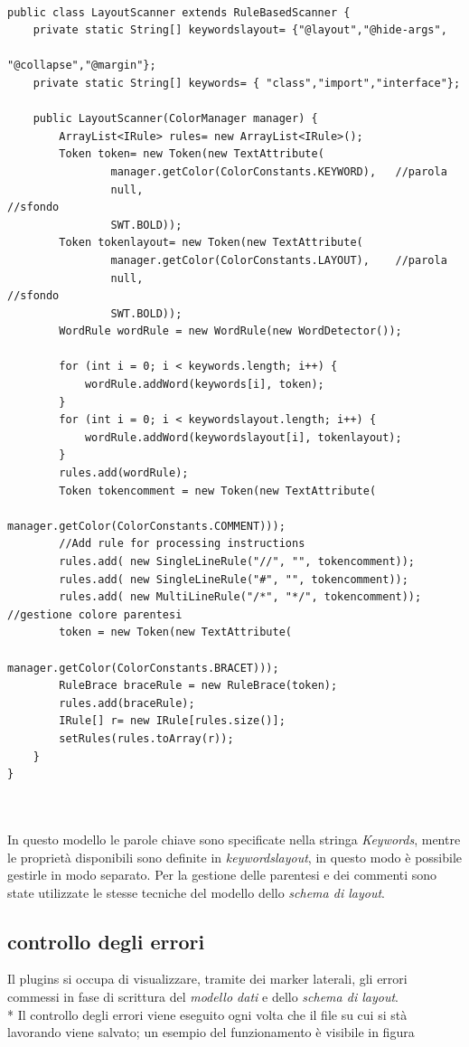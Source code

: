 \begin{lstlisting}[caption={LayoutScanner}, style={java}]

public class LayoutScanner extends RuleBasedScanner {
	private static String[] keywordslayout= {"@layout","@hide-args",
												"@collapse","@margin"};
	private static String[] keywords= { "class","import","interface"};
	
	public LayoutScanner(ColorManager manager) {
		ArrayList<IRule> rules= new ArrayList<IRule>();
		Token token= new Token(new TextAttribute(
				manager.getColor(ColorConstants.KEYWORD), 	//parola
				null, 																			//sfondo
				SWT.BOLD));
		Token tokenlayout= new Token(new TextAttribute(
				manager.getColor(ColorConstants.LAYOUT), 	//parola
				null, 																		//sfondo
				SWT.BOLD));
		WordRule wordRule = new WordRule(new WordDetector());

		for (int i = 0; i < keywords.length; i++) {
			wordRule.addWord(keywords[i], token);
		}
		for (int i = 0; i < keywordslayout.length; i++) {
			wordRule.addWord(keywordslayout[i], tokenlayout);
		}
		rules.add(wordRule);
		Token tokencomment = new Token(new TextAttribute(
								manager.getColor(ColorConstants.COMMENT)));
		//Add rule for processing instructions		
		rules.add( new SingleLineRule("//", "", tokencomment));
		rules.add( new SingleLineRule("#", "", tokencomment));
		rules.add( new MultiLineRule("/*", "*/", tokencomment));
//gestione colore parentesi
		token = new Token(new TextAttribute(
										manager.getColor(ColorConstants.BRACET)));
		RuleBrace braceRule = new RuleBrace(token);
		rules.add(braceRule);
		IRule[] r= new IRule[rules.size()];
		setRules(rules.toArray(r));
	}
}



\end{lstlisting}



In questo modello le parole chiave sono specificate nella
stringa \emph{Keywords}, mentre le proprietà disponibili sono definite in
\emph{keywordslayout}, in questo modo è possibile gestirle in modo separato.
Per la gestione delle parentesi e dei commenti sono state utilizzate le stesse
tecniche del modello dello \emph{schema di layout}.

\subsection{controllo degli errori} 
Il plugins si occupa di visualizzare, tramite dei marker laterali, gli errori 
commessi in fase di scrittura del \emph{modello dati} e dello \emph{schema di
layout}. \\*
Il controllo degli errori viene eseguito ogni volta che il file su cui si stà lavorando
viene salvato; un esempio del funzionamento è visibile in figura 

